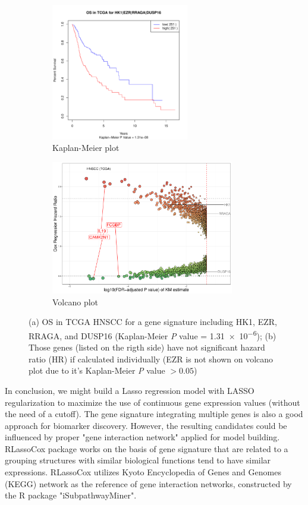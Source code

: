\documentclass[preprint,12pt]{elsarticle}
\newenvironment{MyColorPar}[1]{%
    \leavevmode\color{#1}\ignorespaces%
}{%
}%
\begin{document}
\begin{MyColorPar}{blue}
\begin{figure}[ht]
  \begin{subfigure}[b]{0.3\textwidth}
    \includegraphics[width=6cm]{rplot_KMplot_HK1.pdf}
    \caption{Kaplan-Meier plot}
  \end{subfigure}
  \hfill
  \begin{subfigure}[b]{0.5\textwidth}
    \includegraphics[width=8cm]{Rplot_TCGA_HNSCC_CoxHR_CAMK2N1_signature4_FDRKM.pdf}  
    \caption{Volcano plot}
  \end{subfigure}
  \caption{(a) OS in TCGA HNSCC for a gene signature including HK1, EZR, RRAGA, and DUSP16 (Kaplan-Meier \textit{P} value = \num{1.31e-6}); (b) Those genes (listed on the rigth side) have not significant hazard ratio (HR) if calculated individually (EZR is not shown on volcano plot due to it's Kaplan-Meier \textit{P} value $>0.05$)}
    \label{fig:signature4}
\end{figure}



In conclusion, we might build a Lasso regression model with LASSO regularization to maximize the use of continuous gene expression values (without the need of a cutoff).
The gene signature integrating multiple genes is also a good approach for biomarker discovery.
However, the resulting candidates could be influenced by proper "gene interaction network" applied for model building.
RLassoCox package works on the basis of gene signature that are related to a grouping structures with similar biological functions tend to have similar expressions. 
RLassoCox utilizes Kyoto Encyclopedia of Genes and Genomes (KEGG) network\cite{Simon2011} as the reference of gene interaction networks, constructed by the R package "iSubpathwayMiner".


\end{MyColorPar}
\end{document}
